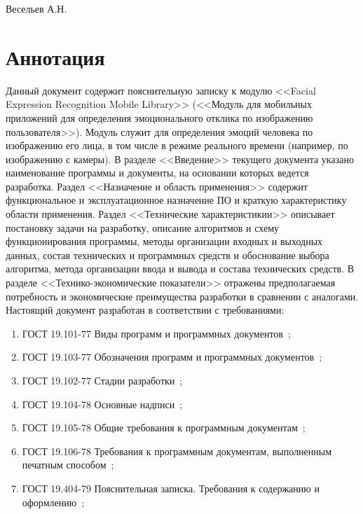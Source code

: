 \documentclass[a4paper,12pt]{article}
\begin{document}
    {Весельев А.Н.}
    \firstPage
    \newpage
    \annotation
    \section*{Аннотация}
    Данный документ содержит пояснительную записку к модулю <<Facial Expression Recognition Mobile Library>> (<<Модуль для мобильных приложений для определения эмоционального отклика по изображению пользователя>>).
    Модуль служит для определения эмоций человека по изображению его лица, в том числе в режиме реального времени (например, по изображению с камеры).
    В разделе <<Введение>> текущего документа указано наименование программы и документы, на основании которых ведется разработка.
    Раздел <<Назначение и область применения>> содержит функциональное и эксплуатационное назначение ПО и краткую характеристику области применения.
    Раздел <<Технические характеристикии>> описывает постановку задачи на разработку, описание алгоритмов и схему функционирования программы, методы организации входных и выходных данных, состав технических и программных средств и обоснование выбора алгоритма, метода организации ввода и вывода и состава технических средств.
    В разделе <<Технико-экономические показатели>> отражены предполагаемая потребность и экономические преимущества разработки в сравнении с аналогами.
    Настоящий документ разработан в соответствии с требованиями:
    \begin{enumerate}
        \item ГОСТ 19.101-77 Виды программ и программных документов~\cite{gost1};
        \item ГОСТ 19.103-77 Обозначения программ и программных документов~\cite{gost2};
        \item ГОСТ 19.102-77 Стадии разработки~\cite{gost3};
        \item ГОСТ 19.104-78 Основные надписи~\cite{gost4};
        \item ГОСТ 19.105-78 Общие требования к программным документам~\cite{gost5};
        \item ГОСТ 19.106-78 Требования к программным документам, выполненным печатным способом~\cite{gost6};
        \item ГОСТ 19.404-79 Пояснительная записка. Требования к содержанию и оформлению~\cite{gost7};
    \end{enumerate}
    \newpage
    \thirdPage
    \newpage
\end{document}

